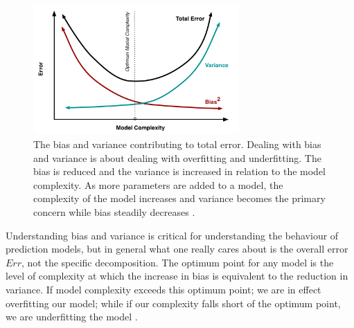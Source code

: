 \begin{figure}[H]
  \centering
    \includegraphics[width=0.7\textwidth]{images/biasvariance.png}
    \caption{The bias and variance contributing to total error. Dealing with bias and variance is about dealing with overfitting and underfitting. The bias is reduced and the variance is increased in relation to the model complexity. As more parameters are added to a model, the complexity of the model increases and variance becomes the primary concern while bias steadily decreases \citep{fortmann2012understanding}.}  
\end{figure}

Understanding bias and variance is critical for understanding the behaviour of prediction models, but in general what one really cares about is the overall error $Err$, not the specific decomposition. The optimum point for any model is the level of complexity at which the increase in bias is equivalent to the reduction in variance. If model complexity exceeds this optimum point; we are in effect overfitting our model; while if our complexity falls short of the optimum point, we are underfitting the model \citep{fortmann2012understanding}.









